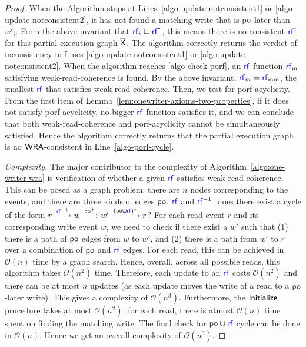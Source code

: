 \begin{proof}
When the Algorithm stops at Lines~\ref{algo-update-notconsistent1} or \ref{algo-update-notconsistent2}, it has not found a matching write that is $\po$-later than $w'_i$. From the above invariant that $\rf_i \sqsubseteq \rf^{\dagger}$, this means there is no consistent $\rf^\dagger$ for this partial execution graph $\overline{\mathsf{\color{black}X}}$. The algorithm correctly returns the verdict of inconsistency in Lines \ref{algo-update-notconsistent1} or \ref{algo-update-notconsistent2}. When the algorithm reaches \ref{algo-check-porf}, an $\rf$ function $\rf_m$ satisfying weak-read-coherence is found. By the above invariant, $\rf_m = \rf_{\min}$, the smallest $\rf$ that satisfies weak-read-coherence. Then, we test for porf-acyclicity. From the first item of Lemma~\ref{lem:onewriter-axioms-two-properties}, if it does not satisfy porf-acyclicity, no bigger $\rf$ function satisfies it, and we can conclude that both weak-read-coherence and porf-acyclicity cannot be simultaneously satisfied. Hence the algorithm correctly returns that the partial execution graph is no $\mathsf{WRA}$-consistent in Line~\ref{algo-porf-cycle}.

\noindent \textit{Complexity.} The major contributor to the complexity of Algorithm~\ref{algo:one-writer-wra} is verification of whether a given $\rf$ satisfies weak-read-coherence. This can be posed as a graph problem: there are $n$ nodes corresponding to the events, and there are three kinds of edges $\po$, $\rf$ and $\rf^{-1}$; does there exist a cycle of the form $r \xra{\rf^{-1}} w \xra{\po^+} w' \xra{(\po \cup \rf)^*} r$?  For each read event $r$ and its corresponding write event $w$, we need to check if there exist a $w'$ such that (1) there is a path of $\po$ edges from $w$ to $w'$, and (2) there is a path from $w'$ to $r$ over a combination of $\po$ and $\rf$ edges. For each read, this can be achieved in $\mathcal{O}(n)$ time by a graph search. Hence, overall, across all possible reads, this algorithm takes $\mathcal{O}(n^2)$ time. Therefore, each update to an $\rf$ costs $\mathcal{O}(n^2)$ and there can be at most $n$ updates (as each update moves the write of a read to a $\po$-later write). This gives a complexity of $\mathcal{O}(n^3)$. Furthermore, the $\mathsf{Initialize}$ procedure takes at most $\mathcal{O}(n^2)$: for each read, there is atmost $\mathcal{O}(n)$ time spent on finding the matching write. The final check for $\po \cup \rf$ cycle can be done in $\mathcal{O}(n)$. Hence we get an overall complexity of $\mathcal{O}(n^3)$. 
\end{proof}

